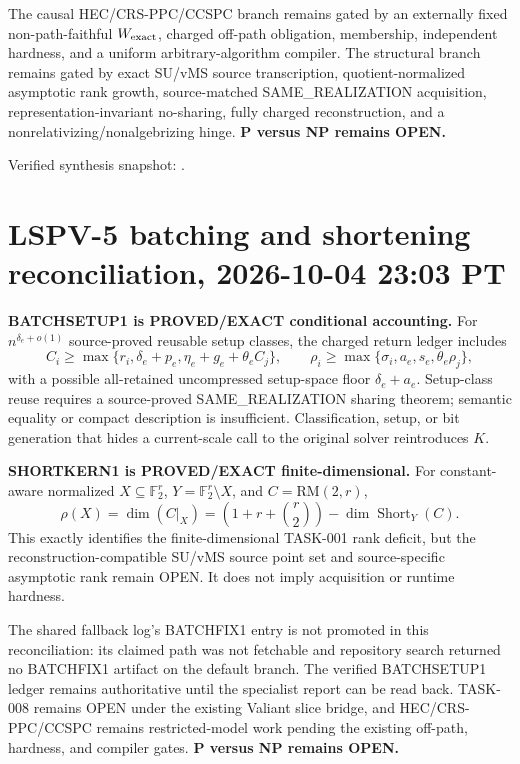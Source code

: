 \documentclass[11pt]{article}
\begin{document}
The causal HEC/CRS-PPC/CCSPC branch remains gated by an externally fixed non-path-faithful $W_{\rm exact}$, charged off-path obligation, membership, independent hardness, and a uniform arbitrary-algorithm compiler. The structural branch remains gated by exact SU/vMS source transcription, quotient-normalized asymptotic rank growth, source-matched SAME\_REALIZATION acquisition, representation-invariant no-sharing, fully charged reconstruction, and a nonrelativizing/nonalgebrizing hinge. \textbf{P versus NP remains OPEN.}

Verified synthesis snapshot: .

\section{LSPV-5 batching and shortening reconciliation, 2026-10-04 23:03 PT}

\textbf{BATCHSETUP1 is PROVED/EXACT conditional accounting.} For $n^{\delta_e+o(1)}$ source-proved reusable setup classes, the charged return ledger includes
\[
C_i\ge\max\{r_i,\delta_e+p_e,\eta_e+g_e+\theta_e C_j\},\qquad
\rho_i\ge\max\{\sigma_i,a_e,s_e,\theta_e\rho_j\},
\]
with a possible all-retained uncompressed setup-space floor $\delta_e+a_e$. Setup-class reuse requires a source-proved SAME\_REALIZATION sharing theorem; semantic equality or compact description is insufficient. Classification, setup, or bit generation that hides a current-scale call to the original solver reintroduces $K$.

\textbf{SHORTKERN1 is PROVED/EXACT finite-dimensional.} For constant-aware normalized $X\subseteq\mathbb F_2^r$, $Y=\mathbb F_2^r\setminus X$, and $C=\mathrm{RM}(2,r)$,
\[
\rho(X)=\dim(C|_X)=\left(1+r+\binom r2\right)-\dim\operatorname{Short}_Y(C).
\]
This exactly identifies the finite-dimensional TASK-001 rank deficit, but the reconstruction-compatible SU/vMS source point set and source-specific asymptotic rank remain OPEN. It does not imply acquisition or runtime hardness.

The shared fallback log's BATCHFIX1 entry is not promoted in this reconciliation: its claimed path was not fetchable and repository search returned no BATCHFIX1 artifact on the default branch. The verified BATCHSETUP1 ledger remains authoritative until the specialist report can be read back. TASK-008 remains OPEN under the existing Valiant slice bridge, and HEC/CRS-PPC/CCSPC remains restricted-model work pending the existing off-path, hardness, and compiler gates. \textbf{P versus NP remains OPEN.}
\end{document}

